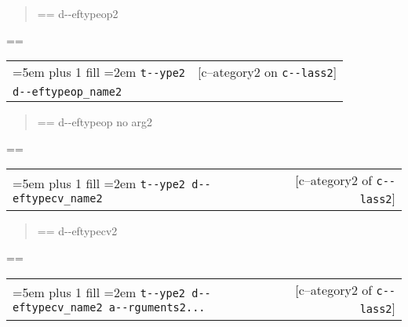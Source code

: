 \documentclass{book}
\makeatletter
\newenvironment{GNUTexinfopreformatted}{%
  \par\GNUTobeylines\obeyspaces\frenchspacing
  \parskip=\z@\parindent=\z@}{}
{\catcode`\^^M=13 \gdef\GNUTobeylines{\catcode`\^^M=13 \def^^M{\null\par}}}
\newenvironment{GNUTexinfoindented}
  {\begin{list}{}{}
  \item\relax}
  {\end{list}}
\makeatother
\begin{document}
\begin{GNUTexinfoindented}
%
\begin{quote}
\unskip{\parskip=0pt\noindent}%
\begin{GNUTexinfopreformatted}%
\ttfamily d{-}{-}eftypeop2
\end{GNUTexinfopreformatted}
\end{quote}
\begin{GNUTexinfopreformatted}%
\ttfamily 
\end{GNUTexinfopreformatted}

\noindent\begin{tabularx}{\linewidth}{@{}Xr}
\rightskip=5em plus 1 fill
\hangindent=2em
\texttt{t{-}{-}ype2}& [c--ategory2 on \texttt{c{-}{-}lass2}]\\
\texttt{d{-}{-}eftypeop\_name2}\end{tabularx}

%
\begin{quote}
\unskip{\parskip=0pt\noindent}%
\begin{GNUTexinfopreformatted}%
\ttfamily d{-}{-}eftypeop no arg2
\end{GNUTexinfopreformatted}
\end{quote}
\begin{GNUTexinfopreformatted}%
\ttfamily 
\end{GNUTexinfopreformatted}

\noindent\begin{tabularx}{\linewidth}{@{}Xr}
\rightskip=5em plus 1 fill
\hangindent=2em
\texttt{t{-}{-}ype2 d{-}{-}eftypecv\_name2}& [c--ategory2 of \texttt{c{-}{-}lass2}]
\end{tabularx}

%
\begin{quote}
\unskip{\parskip=0pt\noindent}%
\begin{GNUTexinfopreformatted}%
\ttfamily d{-}{-}eftypecv2
\end{GNUTexinfopreformatted}
\end{quote}
\begin{GNUTexinfopreformatted}%
\ttfamily 
\end{GNUTexinfopreformatted}

\noindent\begin{tabularx}{\linewidth}{@{}Xr}
\rightskip=5em plus 1 fill
\hangindent=2em
\texttt{t{-}{-}ype2 d{-}{-}eftypecv\_name2 a{-}{-}rguments2...}& [c--ategory2 of \texttt{c{-}{-}lass2}]
\end{tabularx}


\end{GNUTexinfoindented}
\end{document}
